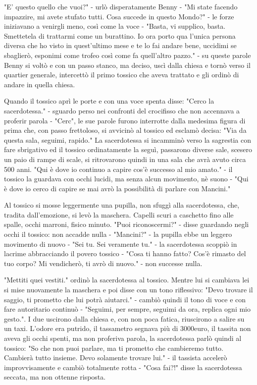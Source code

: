 "E' questo quello che vuoi?" - urlò disperatamente Benny - "Mi state facendo impazzire, mi avete stufato tutti. Cosa succede in questo Mondo?" - le forze iniziavano a venirgli meno, così come la voce - "Basta, vi supplico, basta. Smettetela di trattarmi come un burattino. Io ora porto qua l'unica persona diversa che ho visto in quest'ultimo mese e te lo fai andare bene, uccidimi se sbaglierò, esponimi come trofeo così come fa quell'altro pazzo." - su queste parole Benny si voltò e con un passo stanco, ma deciso, uscì dalla chiesa e tornò verso il quartier generale, intercettò il primo tossico che aveva trattato e gli ordinò di andare in quella chiesa.

Quando il tossico aprì le porte e con una voce spenta disse: "Cerco la sacerdotessa." - sguardo perso nei confronti del crocifisso che non accennava a proferir parola - "Cerc", le sue parole furono interrotte dalla medesima figura di prima che, con passo frettoloso, si avvicinò al tossico ed esclamò decisa: "Via da questa sala, seguimi, rapido."
La sacerdotessa si incamminò verso la sagrestia con fare sbrigativo ed il tossico ordinatamente la seguì, passarono diverse sale, scesero un paio di rampe di scale, si ritrovarono quindi in una sala che avrà avuto circa 500 anni. "Qui è dove io continuo a capire cos'è successo al mio amato." - il tossico la guardava con occhi lucidi, ma senza alcun movimento, nè suono - "Qui è dove io cerco di capire se mai avrò la possibilità di parlare con Mancini." 

Al tossico si mosse leggermente una pupilla, non sfuggì alla sacerdotessa, che, tradita dall'emozione, si levò la maschera. Capelli scuri a caschetto fino alle spalle, occhi marroni, fisico minuto.
"Puoi riconoscermi?" - disse guardando negli occhi il tossico: non accadde nulla - "Mancini?" - la pupilla ebbe un leggero movimento di nuovo - "Sei tu. Sei veramente tu." - la sacerdotessa scoppiò in lacrime abbracciando il povero tossico - "Cosa ti hanno fatto? Cos'è rimasto del tuo corpo? Mi vendicherò, ti avrò di nuovo." - non successe nulla.

"Mettiti quei vestiti." ordinò la sacerdotessa al tossico. Mentre lui si cambiava lei si mise nuovamente la maschera e poi disse con un tono riflessivo: "Devo trovare il saggio, ti prometto che lui potrà aiutarci." - cambiò quindi il tono di voce e con fare autoritario continuò - "Seguimi, per sempre, seguimi da ora, replica ogni mio gesto.". 
I due uscirono dalla chiesa e, con non poca fatica, riuscirono a salire su un taxi. L'odore era putrido, il tassametro segnava più di 3000euro, il tassita non aveva gli occhi spenti, ma non proferiva parola, la sacerdotessa parlò quindi al tossico: "So che non puoi parlare, ma ti prometto che cambieremo tutto. Cambierà tutto insieme. Devo solamente trovare lui." - il tassista accelerò improvvisamente e cambiò totalmente rotta - "Cosa fai?!" disse la sacerdotessa seccata, ma non ottenne risposta.

